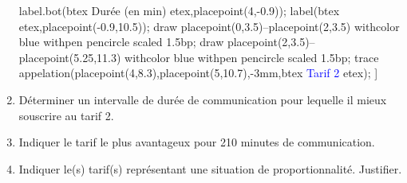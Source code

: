 \begin{exercice*}
\begin{enumerate}
{                label.bot(btex Durée (en min) etex,placepoint(4,-0.9));
                label(btex  etex,placepoint(-0.9,10.5));
                draw placepoint(0,3.5)--placepoint(2,3.5) withcolor blue withpen pencircle scaled 1.5bp;
                draw placepoint(2,3.5)--placepoint(5.25,11.3) withcolor blue withpen pencircle scaled 1.5bp;
                trace appelation(placepoint(4,8.3),placepoint(5,10.7),-3mm,btex \textcolor{blue}{Tarif 2} etex);
            }
        ]{}\par\smallskip
        \item Déterminer un intervalle de durée de communication pour lequelle il mieux souscrire au tarif 2.
        \item Indiquer le tarif le plus avantageux pour 210 minutes de communication.
        \item Indiquer le(s) tarif(s) représentant une situation de proportionnalité. Justifier.
    \end{enumerate}
\end{exercice*}
